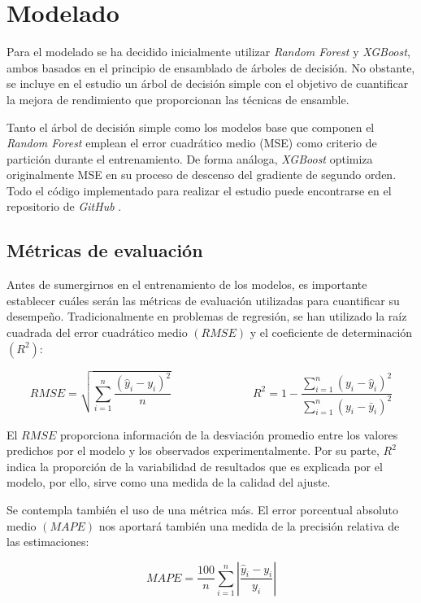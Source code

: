 \documentclass[titlepage, 11pt]{book}
\begin{document}
\section{Modelado}
Para el modelado se ha decidido inicialmente utilizar \textit{Random Forest} y \textit{XGBoost}, ambos basados en el principio de ensamblado de árboles de decisión. No obstante, se incluye en el estudio un árbol de decisión simple con el objetivo de cuantificar la mejora de rendimiento que proporcionan las técnicas de ensamble.

Tanto el árbol de decisión simple como los modelos base que componen el \textit{Random Forest} emplean el error cuadrático medio (MSE) como criterio de partición durante el entrenamiento. De forma análoga, \textit{XGBoost} optimiza originalmente MSE en su proceso de descenso del gradiente de segundo orden. Todo el código implementado para realizar el estudio puede encontrarse en el repositorio de \textit{GitHub} \cite{barba_tfg_repo}.

\subsection{Métricas de evaluación}
Antes de sumergirnos en el entrenamiento de los modelos, es importante establecer cuáles serán las métricas de evaluación utilizadas para cuantificar su desempeño. Tradicionalmente en problemas de regresión, se han utilizado la raíz cuadrada del error cuadrático medio $(RMSE)$ y el coeficiente de determinación $(R^2)$:

\begin{equation*}
    RMSE=\sqrt{\sum_{i=1}^n \frac{(\hat{y}_i-y_i)^2}{n}} \hspace{3cm}  R^2=1-\frac{\sum_{i=1}^n (y_i-\hat{y}_i)^2}{\sum_{i=1}^n (y_i-\bar{y}_i)^2}
\end{equation*}

El $RMSE$ proporciona información de la desviación promedio entre los valores predichos por el modelo y los observados experimentalmente. Por su parte, $R^2$ indica la proporción de la variabilidad de resultados que es explicada por el modelo, por ello, sirve como una medida de la calidad del ajuste.

Se contempla también el uso de una métrica más. El error porcentual absoluto medio $(MAPE)$ nos aportará también una medida de la precisión relativa de las estimaciones:

\begin{equation*}
    MAPE=\frac{100}{n} \sum_{i=1}^n \left|\frac{\hat{y}_i-y_i}{y_i}\right|
\end{equation*}
\end{document}

